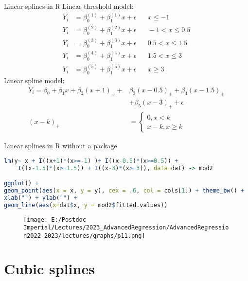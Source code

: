 \documentclass{beamer}
\begin{document}
\begin{frame}{Linear splines in R}
	Linear threshold model:
	\begin{align*}
		Y_i &= \beta_0^{(1)} + \beta_1^{(1)}x + \epsilon \; \; \; \; \; \; x \leq -1\\
		Y_i &= \beta_0^{(2)} + \beta_1^{(2)}x + \epsilon \; \; \; \; \; \; -1< x \leq 0.5\\
		Y_i &= \beta_0^{(3)} + \beta_1^{(3)}x + \epsilon \; \; \; \; \; \; 0.5<x \leq 1.5 \\
		Y_i &= \beta_0^{(4)} + \beta_1^{(4)}x + \epsilon \; \; \; \; \; \; 1.5<x \leq 3 \\
		Y_i &= \beta_0^{(5)} + \beta_1^{(5)}x + \epsilon \; \; \; \; \; \; x\geq 3 
	\end{align*}
	\vspace{-.2cm}
	Linear spline model:
	\begin{align*}
	Y_i = \beta_0 + \beta_1 x +  \beta_2(x+1)_+ +& \beta_3(x-0.5)_+ + \beta_4 (x-1.5)_+ \\ &+ \beta_5 (x-3)_+ + \epsilon \\
	(x-k)_+& = 
	\begin{cases}
	0, x<k \\
	x-k, x\geq k \end{cases}
\end{align*}
\end{frame}

\begin{frame}[fragile]{Linear splines in R without a package}
	\begin{lstlisting}[language=R, basicstyle=\tiny]
lm(y~ x + I((x+1)*(x>=-1) )+ I((x-0.5)*(x>=0.5)) + 
    I((x-1.5)*(x>=1.5)) + I((x-3)*(x>=3)), data=dat) -> mod2

ggplot() + 
geom_point(aes(x = x, y = y), cex = .6, col = cols[1]) + theme_bw() + 
xlab("") + ylab("") +
geom_line(aes(x=dat$x, y = mod2$fitted.values))

	\end{lstlisting}
	\begin{figure}
		\centering	
		\texttt{[image: E:/Postdoc Imperial/Lectures/2023\_AdvancedRegression/AdvancedRegression2022-2023/lectures/graphs/p11.png]}	
	\end{figure}
\end{frame}

\section{Cubic splines}
\end{document}
